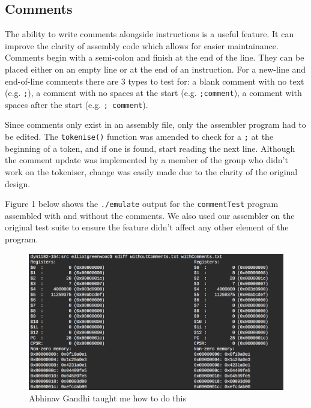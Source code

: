 \documentclass[11pt]{article}
\begin{document}
\subsection{Comments}
The ability to write comments alongside instructions is a useful feature. It can improve the clarity of assembly code which allows for easier maintainance. Comments begin with a semi-colon and finish at the end of the line. They can be placed either on an empty line or at the end of an instruction. For a new-line and end-of-line comments there are 3 types to test for: a blank comment with no text (e.g. \texttt{;}), a comment with no spaces at the start (e.g. \texttt{;comment}), a comment with spaces after the start (e.g. \texttt{; comment}).\newline

\noindent Since comments only exist in an assembly file, only the assembler program had to be edited. The \verb|tokenise()| function was amended to check for a \texttt{;} at the beginning of a token, and if one is found, start reading the next line. Although the comment update was implemented by a member of the group who didn't work on the tokeniser, change was easily made due to the clarity of the original design.\newline

\noindent Figure 1 below shows the \texttt{./emulate} output for the \texttt{commentTest} program assembled with and without the comments. We also used our assembler on the original test suite to ensure the feature didn't affect any other element of the program.


\begin{figure}[H]
	\centering
	\includegraphics[scale = 0.5]{commentTest}
	\caption{Abhinav Gandhi taught me how to do this}
\end{figure}
\end{document}
